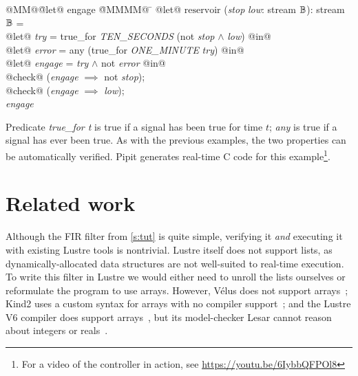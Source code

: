 \documentclass[sigplan,screen, review]{acmart}
\begin{document}
\newcommand\estop{\textit{stop}}
\newcommand\low{\textit{low}}
\newcommand\soltry{\textit{try}}
\newcommand\error{\textit{error}}
\newcommand\solen{\textit{engage}}
\begin{tabbing}
  @MM@\= @let@ engage \= @MMMM@ \= \kill
  @let@ $\mbox{reservoir}$ (\estop{} \low{}: stream $\mathbb{B}$): stream $\mathbb{B}$ = \\
  \> @let@ \soltry{} \> = true\_for \textit{TEN\_SECONDS} (not \estop{} $\wedge$ \low{}) @in@ \\
  \> @let@ \error{} \> = any (true\_for \textit{ONE\_MINUTE} \soltry{}) @in@ \\
  \> @let@ \solen{} \> = \soltry{} $\wedge$ not \error{} @in@ \\
  \> @check@ (\solen{} $\implies$ not \estop{}); \\
  \> @check@ (\solen{} $\implies$ \low{}); \\
  \> \solen{}
\end{tabbing}
\pagebreak

Predicate \emph{true\_for t} is true if a signal has been true for time $t$; \emph{any} is true if a signal has ever been true.
As with the previous examples, the two properties can be automatically verified.
Pipit generates real-time C code for this example\footnote{For a video of the controller in action, see \url{https://youtu.be/6IybbQFPOl8}}.

\section{Related work}
\label{s:related-work}

Although the FIR filter from \autoref{s:tut} is quite simple, verifying it \emph{and} executing it with existing Lustre tools is nontrivial.
Lustre itself does not support lists, as dynamically-allocated data structures are not well-suited to real-time execution.
To write this filter in Lustre we would either need to unroll the lists ourselves or reformulate the program to use arrays.
However, Vélus does not support arrays~\cite{bourke2017formally}; Kind2 uses a custom syntax for arrays with no compiler support~\cite{champion2016kind2}; and the Lustre V6 compiler does support arrays~\cite{jahier2016lustre}, but its model-checker Lesar cannot reason about integers or reals~\cite{raymond2008synchronous}.
\end{document}
